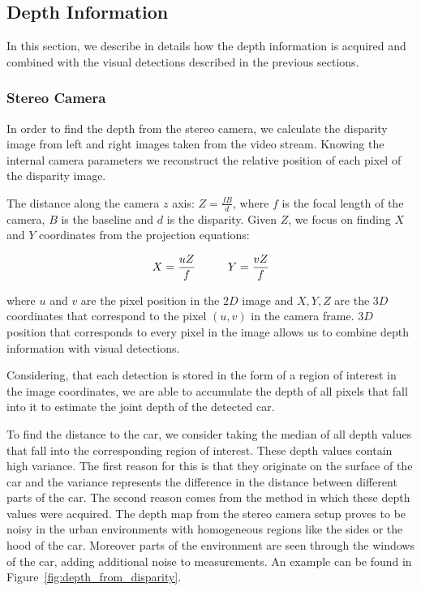 
\subsection{Depth Information}\label{sub:depth_information}

In this section, we describe in details how the depth information is acquired
and combined with the visual detections described in the previous sections.

\subsubsection{Stereo Camera}\label{ssub:stereo_camera}

In order to find the depth from the stereo camera, we calculate the disparity
image from left and right images taken from the video stream. Knowing the
internal camera parameters we reconstruct the relative position of each pixel
of the disparity image.

The distance along the camera $z$ axis: $Z = \frac{fB}{d}$, where $f$ is the
focal length of the camera, $B$ is the baseline and $d$ is the disparity.
Given $Z$, we focus on finding $X$ and $Y$ coordinates from the projection
equations:

\begin{equation}
X = \frac{uZ}{f}
\hspace{10 mm}
Y = \frac{vZ}{f}
\end{equation}

where $u$ and $v$ are the pixel position in the $2D$ image and $X, Y, Z$ are
the $3D$ coordinates that correspond to the pixel $(u,v)$ in the camera frame.
$3D$ position that corresponds to every pixel in the image allows us to
combine depth information with visual detections.

Considering, that each detection is stored in the form of a region of interest
in the image coordinates, we are able to accumulate the depth of all pixels
that fall into it to estimate the joint depth of the detected car.

To find the distance to the car, we consider taking the median of all depth
values that fall into the corresponding region of interest. These depth values
contain high variance. The first reason for this is that they originate on the
surface of the car and the variance represents the difference in the distance
between different parts of the car. The second reason comes from the method in
which these depth values were acquired. The depth map from the stereo camera
setup proves to be noisy in the urban environments with homogeneous regions
like the sides or the hood of the car. Moreover parts of the environment are
seen through the windows of the car, adding additional noise to measurements.
An example can be found in Figure~\ref{fig:depth_from_disparity}.

